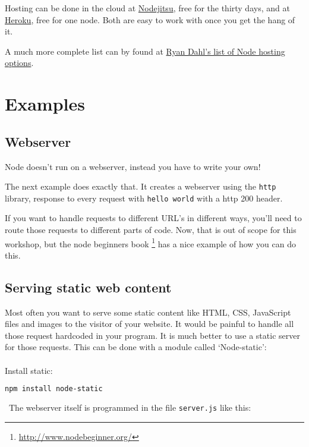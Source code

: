 \documentclass[a4paper]{report}
\begin{document}
Hosting can be done in the cloud at \href{https://www.nodejitsu.com/}{Nodejitsu}, free for the thirty days, and at \href{https://www.heroku.com/}{Heroku}, free for one node. Both are easy to work with once you get the hang of it.

A much more complete list can by found at \href{https://github.com/joyent/node/wiki/Node-Hosting}{Ryan Dahl's list of Node hosting options}.

\section*{Examples}

\subsection*{Webserver}
Node doesn't run on a webserver, instead you have to write your own! 

The next example does exactly that. It creates a webserver using the \texttt{http} library, response to every request with \texttt{hello world} with a http 200 header.



\noindent If you want to handle requests to different URL's in different ways, you'll need to route those requests to different parts of code. Now, that is out of scope for this workshop, but the node beginners book \footnote{\url{http://www.nodebeginner.org/}} has a nice example of how you can do this.

\subsection*{Serving static web content}
Most often you want to serve some static content like HTML, CSS, JavaScript files and images to the visitor of your website. It would be painful to handle all those request hardcoded in your program. It is much better to use a static server for those requests. This can be done with a module called `Node-static':\\
\\
\noindent Install static:
\begin{lstlisting}[language=bash]
npm install node-static
\end{lstlisting}
\noindent\ The webserver itself is programmed in the file \texttt{server.js} like this:

\end{document}

